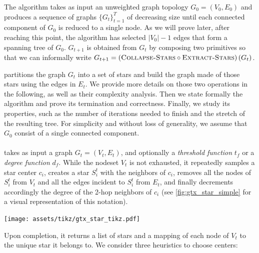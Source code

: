 The \gtx{} algorithm takes as input an unweighted graph topology $G_0=(V_0, E_0)$ and produces a sequence of
graphs $\{G_t\}_{t=1}^T$ of decreasing size until each connected component of $G_0$ is reduced to a
single node. As we will prove later, after reaching this point, the algorithm has selected $|V_0| -
1$ edges that form a spanning tree of $G_0$. $G_{t+1}$ is obtained from $G_t$ by composing two
primitives so that we can informally write $G_{t+1} = \left(\textsc{Collapse-Stars}{} \circ
\textsc{Extract-Stars}{}\right)(G_t)$.

\extractStar{} partitions the graph $G_t$ into a set of stars and \collapseStar{} build the graph
made of those stars using the edges in $E_t$. We provide more details on those two operations in the
following, as well as their complexity analysis. Then we state formally the \gtx{} algorithm and prove
its termination and correctness.  Finally, we study its properties, such as the number of iterations
needed to finish and the stretch of the resulting tree. For simplicity and without loss of
generality, we assume that $G_0$ consist of a single connected component.

\medskip

\paragraph{\extractStar{}}\label{par:extractstar}%
\extractStar{} takes as input a graph $G_t=(V_t, E_t)$, and optionally a \emph{threshold function}
$t_f$ or a \emph{degree function} $d_f$. While the nodeset $V_t$ is not exhausted, it repeatedly samples a
star center $c_i$, creates a star $S_i^t$ with the neighbors of $c_i$, removes all the nodes of $S_i^t$ from
$V_t$ and all the edges incident to $S_i^t$ from $E_t$, and finally decrements accordingly the
degree of the 2-hop neighbors of $c_i$ (see \autoref{fig:gtx_star_simple} for a visual
representation of this notation).
\begin{marginfigure}
  \centering
  \texttt{[image: assets/tikz/gtx\_star\_tikz.pdf]}
  \caption[A sample star]{A sample star created during the \tth{} extraction level. The black node
    is the center $c_i$ of the star $S_i^t$, which is made of the four light gray peripheral nodes
  as well as the solid edges. The 2-hops neighbors of $c_i$ are the white nodes
  $h_1$ to $h_3$, whose degree will decrease once we $S_i^t$ is removed from $G_t$.}
  \label{fig:gtx_star_simple}
\end{marginfigure}
Upon completion, it returns a list of stars and a mapping of
each node of $V_t$ to the unique star it belongs to. We consider three heuristics to choose centers:


